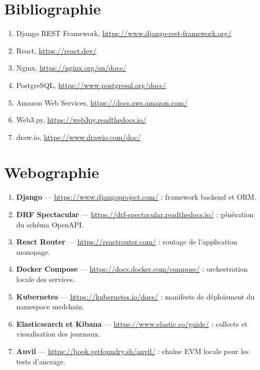 \documentclass[11pt,openany]{memoir}
\begin{document}
\chapter*{Bibliographie}
\begin{enumerate}
\item Django REST Framework, \url{https://www.django-rest-framework.org/}
\item React, \url{https://react.dev/}
\item Nginx, \url{https://nginx.org/en/docs/}
\item PostgreSQL, \url{https://www.postgresql.org/docs/}
\item Amazon Web Services, \url{https://docs.aws.amazon.com/}
\item Web3.py, \url{https://web3py.readthedocs.io/}
\item draw.io, \url{https://www.drawio.com/doc/}
\end{enumerate}

\chapter*{Webographie}
\begin{enumerate}
\item \textbf{Django} --- \url{https://www.djangoproject.com/} : framework backend et ORM.
\item \textbf{DRF Spectacular} --- \url{https://drf-spectacular.readthedocs.io/} : génération du schéma OpenAPI.
\item \textbf{React Router} --- \url{https://reactrouter.com/} : routage de l'application monopage.
\item \textbf{Docker Compose} --- \url{https://docs.docker.com/compose/} : orchestration locale des services.
\item \textbf{Kubernetes} --- \url{https://kubernetes.io/docs/} : manifests de déploiement du namespace medchain.
\item \textbf{Elasticsearch et Kibana} --- \url{https://www.elastic.co/guide/} : collecte et visualisation des journaux.
\item \textbf{Anvil} --- \url{https://book.getfoundry.sh/anvil/} : chaîne EVM locale pour les tests d'ancrage.
\end{enumerate}
\end{document}
